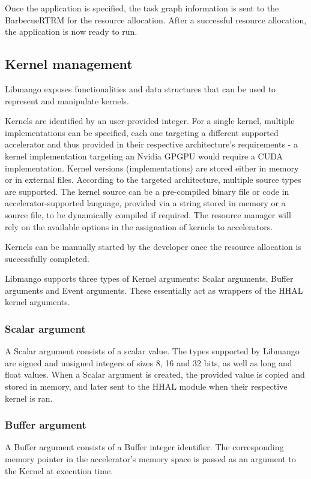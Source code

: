 Once the application is specified, the task graph information is sent to the BarbecueRTRM for the resource allocation. After a successful resource allocation, the application is now ready to run.

\subsection{Kernel management} \label{Libmango:KernelManagement}
Libmango exposes functionalities and data structures that can be used to represent and manipulate kernels.

Kernels are identified by an user-provided integer. For a single kernel, multiple implementations can be specified, each one targeting a different supported accelerator and thus provided in their respective architecture's requirements - a kernel implementation targeting an Nvidia GPGPU would require a CUDA implementation.
Kernel versions (implementations) are stored either in memory or in external files. According to the targeted architecture, multiple source types are supported. The kernel source can be a pre-compiled binary file or code in accelerator-supported language, provided via a string stored in memory or a source file, to be dynamically compiled if required.
The resource manager will rely on the available options in the assignation of kernels to accelerators.

Kernels can be manually started by the developer once the resource allocation is successfully completed.

Libmango supports three types of Kernel arguments: Scalar arguments, Buffer arguments and Event arguments.
These essentially act as wrappers of the HHAL kernel arguments.

\subsubsection{Scalar argument}
A Scalar argument consists of a scalar value. The types supported by Libmango are signed and unsigned integers of sizes 8, 16 and 32 bits, as well as long and float values.
When a Scalar argument is created, the provided value is copied and stored in memory, and later sent to the HHAL module when their respective kernel is ran. 

\subsubsection{Buffer argument}
A Buffer argument consists of a Buffer integer identifier. The corresponding memory pointer in the accelerator's memory space is passed as an argument to the Kernel at execution time.

